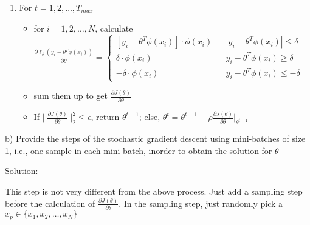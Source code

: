 \documentclass[12pt]{article}
\newcommand{\solu}{{\color{blue} Solution:}}
\begin{document}
\begin{enumerate}
\begin{enumerate}[label=(\roman*)]
            \item For $t = 1,2, \dots, T_{max}$
            \begin{itemize}
                \item for $i = 1,2, \dots, N$, calculate $\frac{\partial \ell_\delta(y_i - \theta^T\phi(x_i))}{\partial \theta} = \left\{ 
                    \begin{array}{rcl}
                        [y_i-\theta^T\phi(x_i)] \cdot \phi(x_i)  & & |y_i-\theta^T\phi(x_i)| \le \delta \\
                        \delta\cdot \phi(x_i) & & y_i-\theta^T\phi(x_i) \ge \delta \\
                        -\delta\cdot \phi(x_i) & & y_i-\theta^T\phi(x_i) \le -\delta
                    \end{array} 
                \right.$
                \item sum them up to get $\frac{\partial J(\theta)}{\partial \theta}$
                \item If $||\frac{\partial J(\theta)}{\partial \theta}||_2^2 \le \epsilon$, return $\theta^{t-1}$; else, $\theta^t = \theta^{t-1} - \rho\frac{\partial J(\theta)}{\partial \theta}|_{\theta^{t-1}}$
            \end{itemize}
        \end{enumerate}

        b) Provide the steps of the stochastic gradient descent using mini-batches of size 1, i.e., one sample in each mini-batch, inorder to obtain the solution for $\theta$
        
        \solu

        This step is not very different from the above process. Just add a sampling step before the calculation of $\frac{\partial J(\theta)}{\partial \theta}$. In the sampling step, just randomly pick a $x_p \in \{x_1, x_2, \dots, x_N\}$
        

\end{enumerate}
\end{document}
